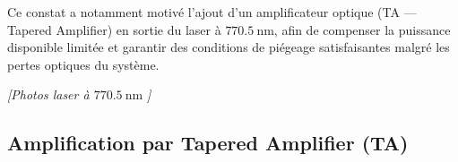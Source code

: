\medskip

Ce constat a notamment motivé l’ajout d’un amplificateur optique (TA — Tapered Amplifier) en sortie du laser à $770.5~\text{nm}$, afin de compenser la puissance disponible limitée et garantir des conditions de piégeage satisfaisantes malgré les pertes optiques du système.

\begin{center}
\textit{[Photos laser à $770.5~\text{nm}$ ]}
\end{center}


\subsection{Amplification par Tapered Amplifier (TA)}

\begin{figure}[!htb]
	\centering
\end{figure}
